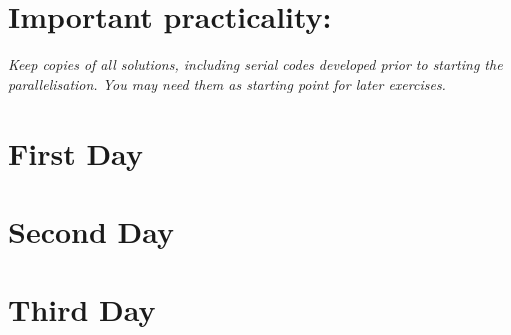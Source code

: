 \documentclass[a4paper,oneside,12pt]{article}
\begin{document}
\section*{Important practicality:}
\textit{Keep copies of all solutions, including serial codes developed prior to starting the parallelisation.  You may need them as starting point for later exercises.}

\pagebreak
\section{First Day}




\pagebreak
\section{Second Day}




\pagebreak
\section{Third Day}


\end{document}
